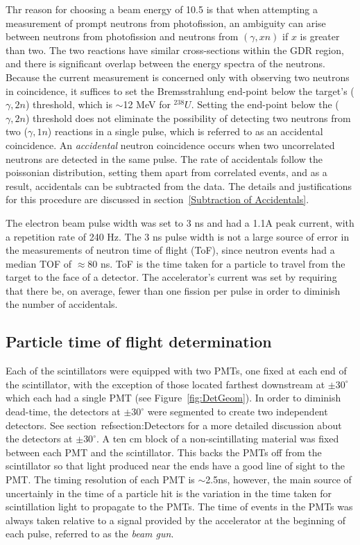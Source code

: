 Thr reason for choosing a beam energy of 10.5 is that when attempting a measurement of prompt neutrons from photofission, an ambiguity can arise between neutrons from photofission and neutrons from $(\gamma, xn)$ if $x$ is greater than two.
The two reactions have similar cross-sections within the GDR region, and there is significant overlap between the energy spectra of the neutrons.
Because the current measurement is concerned only with observing two neutrons in coincidence, it suffices to set the Bremsstrahlung end-point below the target's ($\gamma, 2n$) threshold, which is $\sim$12 MeV for $^{238}U$.
Setting the end-point below the ($\gamma, 2n$) threshold does not eliminate the possibility of detecting two neutrons from  two ($\gamma, 1n$) reactions in a single pulse, which is referred to as an accidental coincidence.
An \textit{accidental} neutron coincidence occurs when two uncorrelated neutrons are detected in the same pulse.
The rate of accidentals follow the poissonian distribution, setting them apart from correlated events, and as a result, accidentals can be subtracted from the data.
The details and justifications for this procedure are discussed in section~\ref{Subtraction of Accidentals}.

The electron beam pulse width was set to 3 ns and had a 1.1A peak current, with a repetition rate of 240 Hz.
The 3 ns pulse width is not a large source of error in the measurements of neutron time of flight (ToF), since neutron events had a median TOF of $\approx$80 ns.
ToF is the time taken for a particle to travel from the target to the face of a detector.
The accelerator's current was set by requiring that there be, on average, fewer than one fission per pulse in order to diminish the number of accidentals.

\subsection{Particle time of flight determination}
\label{reconstruction}
Each of the scintillators were equipped with two PMTs, one fixed at each end of the scintillator, with the exception of those located farthest downstream at $\pm30^{\circ}$ which each had a single PMT (see Figure~\ref{fig:DetGeom}).
In order to diminish dead-time, the detectors at $\pm30^{\circ}$ were segmented to create two independent detectors.
See section~ref{section:Detectors} for a more detailed discussion about the detectors at $\pm30^{\circ}$.
A ten cm block of a non-scintillating material was fixed between each PMT and the scintillator.
This backs the PMTs off from the scintillator so that light produced near the ends have a good line of sight to the PMT.
The timing resolution of each PMT is $\sim$2.5ns, however, the main source of uncertainly in the time of a particle hit is the variation in the time taken for scintillation light to propagate to the PMTs.
The time of events in the PMTs was always taken relative to a signal provided by the accelerator at the beginning of each pulse, referred to as the \textit{beam gun}.


